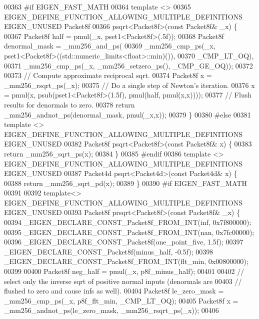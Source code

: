 \begin{DoxyCode}
00363 \textcolor{preprocessor}{#if EIGEN\_FAST\_MATH}
00364 \textcolor{keyword}{template} <>
00365 EIGEN\_DEFINE\_FUNCTION\_ALLOWING\_MULTIPLE\_DEFINITIONS EIGEN\_UNUSED Packet8f
00366 psqrt<Packet8f>(\textcolor{keyword}{const} Packet8f& \_x) \{
00367   Packet8f half = pmul(\_x, pset1<Packet8f>(.5f));
00368   Packet8f denormal\_mask = \_mm256\_and\_ps(
00369       \_mm256\_cmp\_ps(\_x, pset1<Packet8f>((std::numeric\_limits<float>::min)()),
00370                     \_CMP\_LT\_OQ),
00371       \_mm256\_cmp\_ps(\_x, \_mm256\_setzero\_ps(), \_CMP\_GE\_OQ));
00372 
00373   \textcolor{comment}{// Compute approximate reciprocal sqrt.}
00374   Packet8f x = \_mm256\_rsqrt\_ps(\_x);
00375   \textcolor{comment}{// Do a single step of Newton's iteration.}
00376   x = pmul(x, psub(pset1<Packet8f>(1.5f), pmul(half, pmul(x,x))));
00377   \textcolor{comment}{// Flush results for denormals to zero.}
00378   \textcolor{keywordflow}{return} \_mm256\_andnot\_ps(denormal\_mask, pmul(\_x,x));
00379 \}
00380 \textcolor{preprocessor}{#else}
00381 \textcolor{keyword}{template} <> EIGEN\_DEFINE\_FUNCTION\_ALLOWING\_MULTIPLE\_DEFINITIONS EIGEN\_UNUSED
00382 Packet8f psqrt<Packet8f>(\textcolor{keyword}{const} Packet8f& x) \{
00383   \textcolor{keywordflow}{return} \_mm256\_sqrt\_ps(x);
00384 \}
00385 \textcolor{preprocessor}{#endif}
00386 \textcolor{keyword}{template} <> EIGEN\_DEFINE\_FUNCTION\_ALLOWING\_MULTIPLE\_DEFINITIONS EIGEN\_UNUSED
00387 Packet4d psqrt<Packet4d>(\textcolor{keyword}{const} Packet4d& x) \{
00388   \textcolor{keywordflow}{return} \_mm256\_sqrt\_pd(x);
00389 \}
00390 \textcolor{preprocessor}{#if EIGEN\_FAST\_MATH}
00391 
00392 \textcolor{keyword}{template}<> EIGEN\_DEFINE\_FUNCTION\_ALLOWING\_MULTIPLE\_DEFINITIONS EIGEN\_UNUSED
00393 Packet8f prsqrt<Packet8f>(\textcolor{keyword}{const} Packet8f& \_x) \{
00394   \_EIGEN\_DECLARE\_CONST\_Packet8f\_FROM\_INT(inf, 0x7f800000);
00395   \_EIGEN\_DECLARE\_CONST\_Packet8f\_FROM\_INT(nan, 0x7fc00000);
00396   \_EIGEN\_DECLARE\_CONST\_Packet8f(one\_point\_five, 1.5f);
00397   \_EIGEN\_DECLARE\_CONST\_Packet8f(minus\_half, -0.5f);
00398   \_EIGEN\_DECLARE\_CONST\_Packet8f\_FROM\_INT(flt\_min, 0x00800000);
00399 
00400   Packet8f neg\_half = pmul(\_x, p8f\_minus\_half);
00401 
00402   \textcolor{comment}{// select only the inverse sqrt of positive normal inputs (denormals are}
00403   \textcolor{comment}{// flushed to zero and cause infs as well).}
00404   Packet8f le\_zero\_mask = \_mm256\_cmp\_ps(\_x, p8f\_flt\_min, \_CMP\_LT\_OQ);
00405   Packet8f x = \_mm256\_andnot\_ps(le\_zero\_mask, \_mm256\_rsqrt\_ps(\_x));
00406 

\end{DoxyCode}
